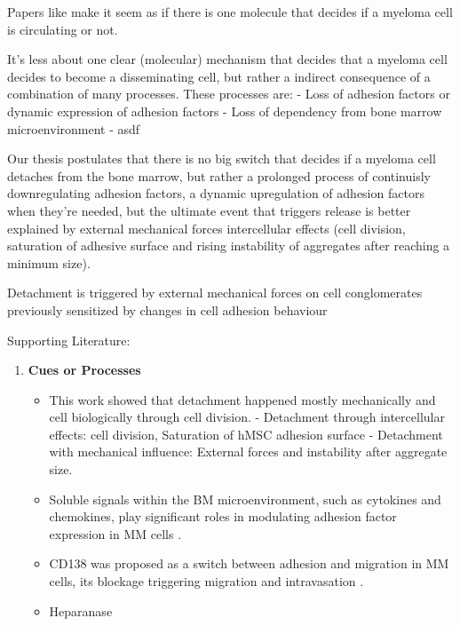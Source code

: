 Papers like \citet{akhmetzyanovaDynamicCD138Surface2020} make it seem as if
there is one molecule that decides if a myeloma cell is circulating or not.

It's less about one clear (molecular) mechanism that decides that a myeloma cell
decides to become a disseminating cell, but rather a indirect consequence of a
combination of many processes.
These processes are:
- Loss of adhesion factors or dynamic expression of adhesion factors
- Loss of dependency from bone marrow microenvironment
- asdf

Our thesis postulates that there is no big switch that decides if a myeloma cell
detaches from the bone marrow, but rather a prolonged process of continuisly
downregulating adhesion factors, a dynamic upregulation of adhesion factors when
they're needed, but the ultimate event that triggers release is better
explained by external mechanical forces intercellular effects (cell division,
saturation of adhesive surface and rising instability of aggregates after
reaching a minimum size).

Detachment is triggered by external mechanical forces on cell
conglomerates previously sensitized by changes in cell adhesion behaviour

Supporting Literature:

\begin{enumerate}
      \item \textbf{Cues or Processes}
            \begin{itemize}
                  \item This work showed that detachment happened mostly
                        mechanically and cell biologically through cell
                        division. - Detachment through intercellular effects:
                        cell division, Saturation of hMSC adhesion surface -
                        Detachment with mechanical influence: External forces
                        and instability after aggregate size.
                  \item Soluble signals within the BM microenvironment, such as
                        cytokines and chemokines, play significant roles in
                        modulating adhesion factor expression in MM cells
                        \cite{aggarwalChemokinesMultipleMyeloma2006,
                              alsayedMechanismsRegulationCXCR42007}.
                  \item CD138 was proposed as a switch between adhesion and
                        migration in MM cells, its blockage triggering migration
                        and intravasation
                        \cite{akhmetzyanovaDynamicCD138Surface2020}.
                  \item Heparanase \cite{yangHeparanasePromotesSpontaneous2005}
            \end{itemize}
\end{enumerate}



